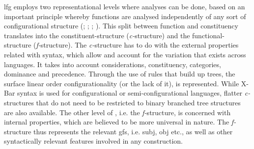 \documentclass[output=paper]{LSP/langsci}
\begin{document}
{\sc lfg} employs two representational levels where  analyses can be done, based on an important principle whereby  functions are analysed independently of any sort of configurational structure (; ; ; ). This split between function and constituency translates into the constituent-structure (\emph{c-}structure) and the functional-structure (\emph{f-}structure). The \emph{c-}structure has to do with the external properties related with syntax, which allow and account for the variation that exists across languages. It takes into account  considerations, constituency,  categories, dominance and precedence. Through the use of  rules that build up  trees, the surface linear order configurationality (or the lack of it), is represented. While X-Bar syntax  is used for configurational or semi-configurational languages, flatter \emph{c-}structures that do not need to be restricted to binary branched tree structures are also available. The other level of , i.e. the \emph{f-}structure, is concerned with internal  properties, which are believed to be more universal in nature. The \emph{f-}structure thus represents the relevant {\sc gf}s, i.e. {\sc subj}, {\sc obj} etc., as well as other syntactically relevant features involved in any  construction.
\end{document}
